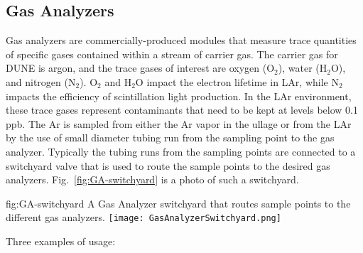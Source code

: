\subsection{Gas Analyzers}
\label{sec:fdgen-slow-cryo-gas-anlyz}

 Gas analyzers are commercially-produced modules that measure trace quantities of specific gases contained within a stream of carrier gas. The carrier gas for DUNE is argon, and the trace gases of interest are oxygen ($\text{O}_2$), water ($\text{H}_2\text{O}$), and nitrogen ($\text{N}_2$). $\text{O}_2$ and $\text{H}_2\text{O}$ impact the electron lifetime in LAr, while $\text{N}_2$ impacts the efficiency of scintillation light production. In the LAr environment, these trace gases represent contaminants that need to be kept at levels below 0.1 ppb.
The Ar is sampled from either the Ar vapor in the ullage or from the LAr by the use of small diameter tubing run from the sampling point to the gas analyzer. Typically the tubing runs from the sampling points are connected to a switchyard valve that is used to route the sample points to the desired gas analyzers. Fig.~\ref{fig:GA-switchyard} is a photo of such a switchyard.

\begin{dunefigure}{fig:GA-switchyard}
  {A Gas Analyzer switchyard that routes sample points to the different gas analyzers.}
  \texttt{[image: GasAnalyzerSwitchyard.png]}%
\end{dunefigure}

Three examples of usage:

